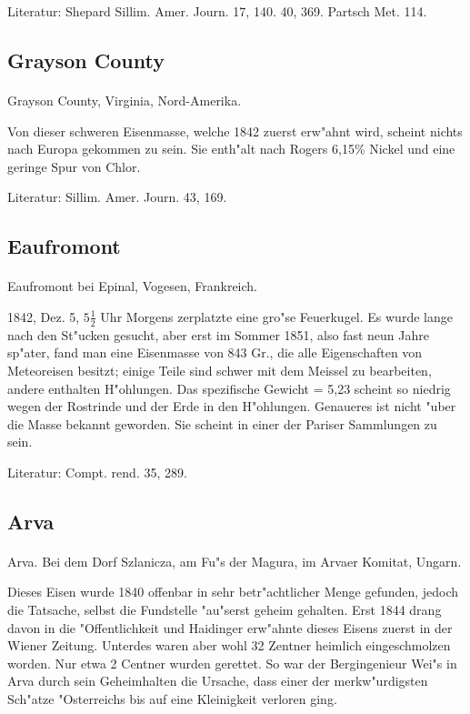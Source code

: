 \documentclass[a4paper, 11pt, oneside]{article}
\begin{document}
\footnotesize
Literatur: Shepard Sillim. Amer. Journ. 17, 140. 40, 369. Partsch Met. 114.

\subsection{Grayson County}
\normalsize
\paragraph{}
Grayson County, Virginia, Nord-Amerika.

Von dieser schweren Eisenmasse, welche 1842 zuerst erw"ahnt wird, scheint nichts nach Europa gekommen zu sein. Sie enth"alt nach Rogers 6,15\% Nickel und eine geringe Spur von Chlor.

\footnotesize
Literatur: Sillim. Amer. Journ. 43, 169.

\subsection{Eaufromont}
\normalsize
\paragraph{}
Eaufromont bei Epinal, Vogesen, Frankreich.

1842, Dez. 5, $5\frac{1}{2}$ Uhr Morgens zerplatzte eine gro"se Feuerkugel. Es wurde lange nach den St"ucken gesucht, aber erst im Sommer 1851, also fast neun Jahre sp"ater, fand man eine Eisenmasse von 843 Gr., die alle Eigenschaften von Meteoreisen besitzt; einige Teile sind schwer mit dem Meissel zu bearbeiten, andere enthalten H"ohlungen. Das spezifische Gewicht = 5,23 scheint so niedrig wegen der Rostrinde und der Erde in den H"ohlungen. Genaueres ist nicht "uber die Masse bekannt geworden. Sie scheint in einer der Pariser Sammlungen zu sein.

\footnotesize
Literatur: Compt. rend. 35, 289.

\subsection{Arva}
\normalsize
\paragraph{}
Arva. Bei dem Dorf Szlanicza, am Fu"s der Magura, im Arvaer Komitat, Ungarn.

Dieses Eisen wurde 1840 offenbar in sehr betr"achtlicher Menge gefunden, jedoch die Tatsache, selbst die Fundstelle "au"serst geheim gehalten. Erst 1844 drang davon in die "Offentlichkeit und Haidinger erw"ahnte dieses Eisens zuerst in der Wiener Zeitung. Unterdes waren aber wohl 32 Zentner heimlich eingeschmolzen worden. Nur etwa 2 Centner wurden gerettet. So war der Bergingenieur Wei"s in Arva durch sein Geheimhalten die Ursache, dass einer der merkw"urdigsten Sch"atze "Osterreichs bis auf eine Kleinigkeit verloren ging.
\end{document}
